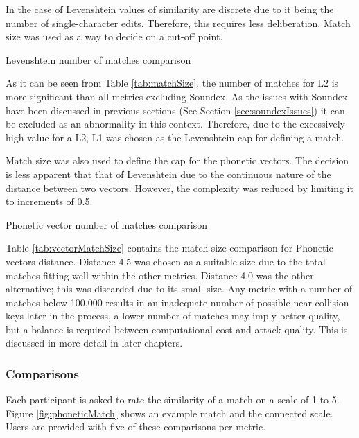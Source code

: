 In the case of Levenshtein values of similarity are discrete due to it being the number of single-character edits. Therefore, this requires less deliberation. Match size was used as a way to decide on a cut-off point.

\begin{table}[h!]
    \centering
    
    \caption{Levenshtein number of matches comparison}
    \label{tab:matchSize}
\end{table}

As it can be seen from Table \ref{tab:matchSize}, the number of matches for L2 is more significant than all metrics excluding Soundex. As the issues with Soundex have been discussed in previous sections (See Section \ref{sec:soundexIssues}) it can be excluded as an abnormality in this context. Therefore, due to the excessively high value for a L2, L1 was chosen as the Levenshtein cap for defining a match.

Match size was also used to define the cap for the phonetic vectors. The decision is less apparent that that of Levenshtein due to the continuous nature of the distance between two vectors. However, the complexity was reduced by limiting it to increments of 0.5.

\begin{table}[h!]
    \centering
    
    \caption{Phonetic vector number of matches comparison}
    \label{tab:vectorMatchSize}
\end{table}

Table \ref{tab:vectorMatchSize} contains the match size comparison for Phonetic vectors distance. Distance 4.5 was chosen as a suitable size due to the total matches fitting well within the other metrics. Distance 4.0 was the other alternative; this was discarded due to its small size. Any metric with a number of matches below 100,000 results in an inadequate number of possible near-collision keys later in the process, a lower number of matches may imply better quality, but a balance is required between computational cost and attack quality. This is discussed in more detail in later chapters.


\subsubsection{Comparisons}
Each participant is asked to rate the similarity of a match on a scale of 1 to 5. Figure \ref{fig:phoneticMatch} shows an example match and the connected scale. Users are provided with five of these comparisons per metric.

